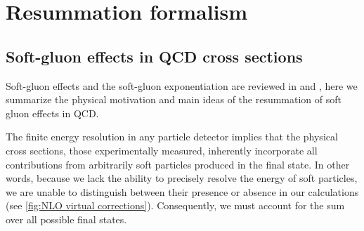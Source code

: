 \documentclass[../Tesi_Jiahao_Miao_986136.tex]{subfiles}
\begin{document}
\chapter{Resummation formalism}\label{ch:resummation}

\section{Soft-gluon effects in QCD cross sections} \label{sec:Soft_gluon_effects}

Soft-gluon effects and the soft-gluon exponentiation are reviewed in \cite{Catani_1997} and \cite{catani1997softgluon}, here we summarize the physical 
motivation and main ideas of the resummation of soft gluon effects in QCD.

The finite energy resolution in any particle detector implies that the physical cross sections, 
those experimentally measured, inherently incorporate all contributions from arbitrarily soft particles 
produced in the final state. In other words, because we lack the ability to precisely resolve the energy 
of soft particles, we are unable to distinguish between their presence or absence in our calculations (see \cref{fig:NLO virtual corrections}). 
Consequently, we must account for the sum over all possible final states.
\end{document}
